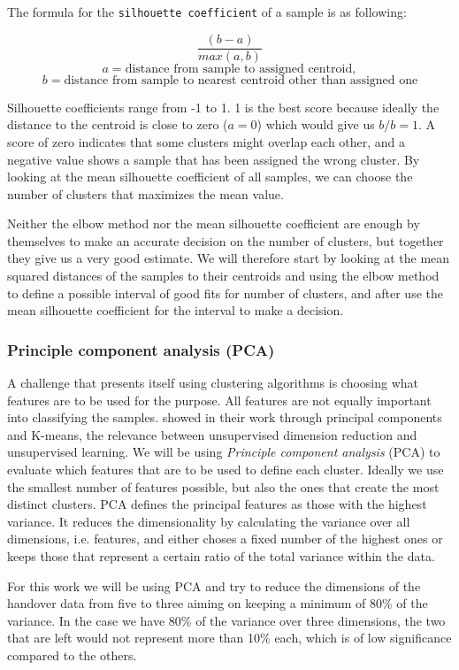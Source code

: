 The formula for the \texttt{silhouette coefficient} of a sample is as following:

\[
	\frac{(b - a)}{max(a, b)}
\]
\[
	a = \text{distance from sample to assigned centroid},
\]
\[
	b = \text{distance from sample to nearest centroid other than assigned one}
\]

Silhouette coefficients range from -1 to 1. 1 is the best score because ideally the distance to the centroid is close to zero (\(a = 0\)) which would give us \(b / b = 1\). A score of zero indicates that some clusters might overlap each other, and a negative value shows a sample that has been assigned the wrong cluster. By looking at the mean silhouette coefficient of all samples, we can choose the number of clusters that maximizes the mean value.

Neither the elbow method nor the mean silhouette coefficient are enough by themselves to make an accurate decision on the number of clusters, but together they give us a very good estimate. We will therefore start by looking at the mean squared distances of the samples to their centroids and using the elbow method to define a possible interval of good fits for number of clusters, and after use the mean silhouette coefficient for the interval to make a decision.


\subsubsection{Principle component analysis (PCA)}

A challenge that presents itself using clustering algorithms is choosing what features are to be used for the purpose. All features are not equally important into classifying the samples. \textcite{Ding2004} showed in their work through principal components and K-means, the relevance between unsupervised dimension reduction and unsupervised learning. We will be using \emph{Principle component analysis} (PCA) to evaluate which features that are to be used to define each cluster. Ideally we use the smallest number of features possible, but also the ones that create the most distinct clusters. PCA defines the principal features as those with the highest variance. It reduces the dimensionality by calculating the variance over all dimensions, i.e. features, and either choses a fixed number of the highest ones or keeps those that represent a certain ratio of the total variance within the data.

For this work we will be using PCA and try to reduce the dimensions of the handover data from five to three aiming on keeping a minimum of 80\% of the variance. In the case we have 80\% of the variance over three dimensions, the two that are left would not represent more than 10\% each, which is of low significance compared to the others.

